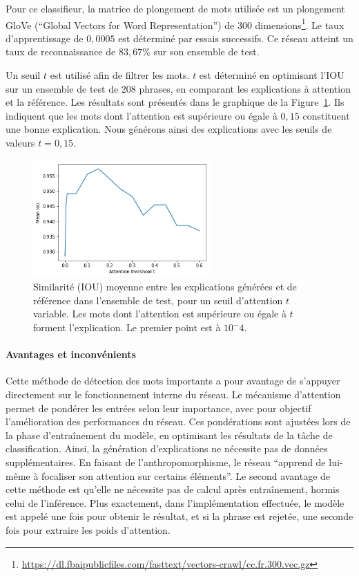 Pour ce classifieur, la matrice de plongement de mots utilisée est un plongement GloVe (``Global Vectors for Word Representation'') de 300 dimensions\footnote{\url{https://dl.fbaipublicfiles.com/fasttext/vectors-crawl/cc.fr.300.vec.gz}}. Le taux d'apprentissage de $0,0005$ est déterminé par essais successifs. Ce réseau atteint un taux de reconnaissance de $83,67\%$ sur son ensemble de test.

Un seuil $t$ est utilisé afin de filtrer les mots. $t$ est déterminé en optimisant l'IOU sur un ensemble de test de 208 phrases, en comparant les explications à attention et la référence. Les résultats sont présentés dans le graphique de la Figure~\ref{fig:threshold}. Ils indiquent que les mots dont l'attention est supérieure ou égale à $0,15$ constituent une bonne explication. Nous générons ainsi des explications avec les seuils de valeurs $t = 0,15$.

\begin{figure}[t]
     \setlength{\belowcaptionskip}{-20pt}
   \begin{center}
     \includegraphics[height=4.5cm]{./S2-Explicabilite_locale/figures/plot_iou_threshold.png}
     \caption{Similarité (IOU) moyenne entre les explications générées et de référence dans l'ensemble de test, pour un seuil d'attention $t$ variable. Les mots dont l'attention est supérieure ou égale à $t$ forment l'explication. Le premier point est à $10^-4$. }\label{fig:threshold}
   \end{center}
\end{figure}

\paragraph{Avantages et inconvénients}
Cette méthode de détection des mots importants a pour avantage de s'appuyer directement sur le fonctionnement interne du réseau. Le mécanisme d'attention permet de pondérer les entrées selon leur importance, avec pour objectif l'amélioration des performances du réseau. Ces pondérations sont ajustées lors de la phase d'entraînement du modèle, en optimisant les résultats de la tâche de classification. Ainsi, la génération d'explications ne nécessite pas de données supplémentaires. En faisant de l'anthropomorphisme, le réseau ``apprend de lui-même à focaliser son attention sur certains éléments''.
Le second avantage de cette méthode est qu'elle ne nécessite pas de calcul après entraînement, hormis celui de l'inférence. Plus exactement, dans l'implémentation effectuée, le modèle est appelé une fois pour obtenir le résultat, et si la phrase est rejetée, une seconde fois pour extraire les poids d'attention.

